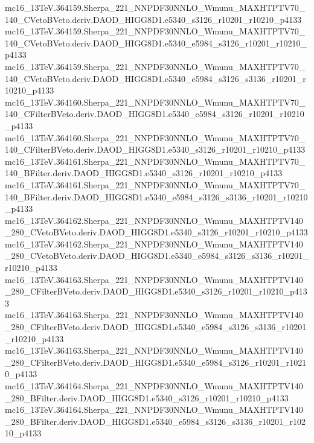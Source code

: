 \begin{footnotesize}
mc16\_13TeV.364159.Sherpa\_221\_NNPDF30NNLO\_Wmunu\_MAXHTPTV70\_140\_CVetoBVeto.deriv.DAOD\_HIGG8D1.e5340\_s3126\_r10201\_r10210\_p4133 \\
mc16\_13TeV.364159.Sherpa\_221\_NNPDF30NNLO\_Wmunu\_MAXHTPTV70\_140\_CVetoBVeto.deriv.DAOD\_HIGG8D1.e5340\_e5984\_s3126\_r10201\_r10210\_p4133 \\
mc16\_13TeV.364159.Sherpa\_221\_NNPDF30NNLO\_Wmunu\_MAXHTPTV70\_140\_CVetoBVeto.deriv.DAOD\_HIGG8D1.e5340\_e5984\_s3126\_s3136\_r10201\_r10210\_p4133 \\
mc16\_13TeV.364160.Sherpa\_221\_NNPDF30NNLO\_Wmunu\_MAXHTPTV70\_140\_CFilterBVeto.deriv.DAOD\_HIGG8D1.e5340\_e5984\_s3126\_r10201\_r10210\_p4133 \\
mc16\_13TeV.364160.Sherpa\_221\_NNPDF30NNLO\_Wmunu\_MAXHTPTV70\_140\_CFilterBVeto.deriv.DAOD\_HIGG8D1.e5340\_s3126\_r10201\_r10210\_p4133 \\
mc16\_13TeV.364161.Sherpa\_221\_NNPDF30NNLO\_Wmunu\_MAXHTPTV70\_140\_BFilter.deriv.DAOD\_HIGG8D1.e5340\_s3126\_r10201\_r10210\_p4133 \\
mc16\_13TeV.364161.Sherpa\_221\_NNPDF30NNLO\_Wmunu\_MAXHTPTV70\_140\_BFilter.deriv.DAOD\_HIGG8D1.e5340\_e5984\_s3126\_s3136\_r10201\_r10210\_p4133 \\
mc16\_13TeV.364162.Sherpa\_221\_NNPDF30NNLO\_Wmunu\_MAXHTPTV140\_280\_CVetoBVeto.deriv.DAOD\_HIGG8D1.e5340\_s3126\_r10201\_r10210\_p4133 \\
mc16\_13TeV.364162.Sherpa\_221\_NNPDF30NNLO\_Wmunu\_MAXHTPTV140\_280\_CVetoBVeto.deriv.DAOD\_HIGG8D1.e5340\_e5984\_s3126\_s3136\_r10201\_r10210\_p4133 \\
mc16\_13TeV.364163.Sherpa\_221\_NNPDF30NNLO\_Wmunu\_MAXHTPTV140\_280\_CFilterBVeto.deriv.DAOD\_HIGG8D1.e5340\_s3126\_r10201\_r10210\_p4133 \\
mc16\_13TeV.364163.Sherpa\_221\_NNPDF30NNLO\_Wmunu\_MAXHTPTV140\_280\_CFilterBVeto.deriv.DAOD\_HIGG8D1.e5340\_e5984\_s3126\_s3136\_r10201\_r10210\_p4133 \\
mc16\_13TeV.364163.Sherpa\_221\_NNPDF30NNLO\_Wmunu\_MAXHTPTV140\_280\_CFilterBVeto.deriv.DAOD\_HIGG8D1.e5340\_e5984\_s3126\_r10201\_r10210\_p4133 \\
mc16\_13TeV.364164.Sherpa\_221\_NNPDF30NNLO\_Wmunu\_MAXHTPTV140\_280\_BFilter.deriv.DAOD\_HIGG8D1.e5340\_s3126\_r10201\_r10210\_p4133 \\
mc16\_13TeV.364164.Sherpa\_221\_NNPDF30NNLO\_Wmunu\_MAXHTPTV140\_280\_BFilter.deriv.DAOD\_HIGG8D1.e5340\_e5984\_s3126\_s3136\_r10201\_r10210\_p4133 \\

\end{footnotesize}
